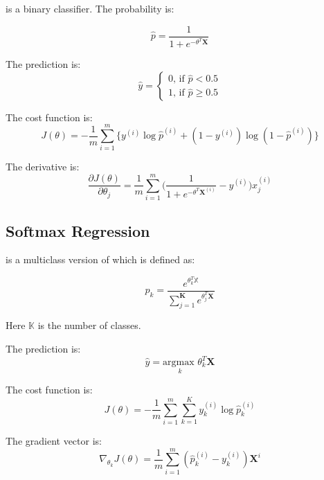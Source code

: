  is a binary classifier. The probability is:

\begin{equation}
	\hat{p} = \frac{1}{1+e^{-\mathbb{\theta}^T  \mathbf{X}}}
\end{equation}

The prediction is:
\begin{equation}
	\hat{y} = \begin{cases}
		0 \text{, if } \hat{p} < 0.5 \\
		1 \text{, if } \hat{p} \geq 0.5
	\end{cases}
\end{equation}

The cost function is:
\begin{equation}
	J(\theta) = - \frac{1}{m} \sum_{i=1}^m \Big\{ y^{(i)} \log \hat{p}^{(i)} + (1-y^{(i)}) \log (1-\hat{p}^{(i)}) \Big\}
\end{equation}

The derivative is:
\begin{equation}
	\frac{\partial J(\theta)}{\partial \theta_j} = \frac{1}{m} \sum_{i=1}^m \Big( \frac{1}{1+e^{-\mathbb{\theta}^T \mathbf{X}^{(i)}}} - y^{(i)} \Big) x_j^{(i)}
\end{equation}


\subsection{Softmax Regression}
 is a multiclass version of  which is defined as:

\begin{equation}
	\hat{p}_k = \frac{e^{\theta_k^T \mathbb{X}}}{\sum\limits_{j=1}^{\mathbf{K}} e^{\theta_j^T \mathbf{X}}}
\end{equation}

Here $\mathbb{K}$ is the number of classes.


The prediction is:
\begin{equation}
	\hat{y} = \underset{k}{\text{argmax }} \theta_k^T \mathbf{X}
\end{equation}

The cost function is:
\begin{equation}
	J(\theta)= -\frac{1}{m} \sum_{i=1}^m \sum_{k=1}^K y_k^{(i)} \log \hat{p}_k^{(i)}
\end{equation}


The gradient vector is:
\begin{equation}
	\nabla_{\theta_k} J(\theta) = \frac{1}{m} \sum_{i=1}^m(\hat{p}_k^{(i)} - y_k^{(i)}) \mathbf{X}^i
\end{equation}
